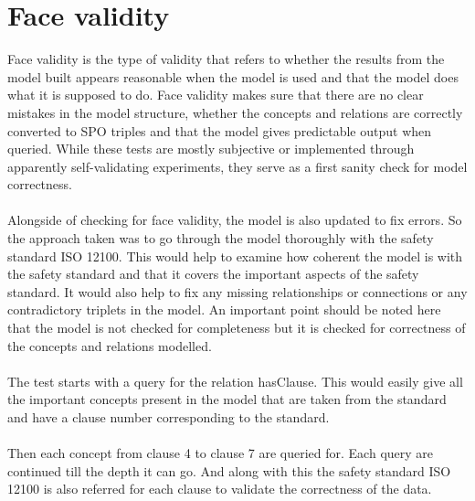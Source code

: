 \section{Face validity} \label{face_validity}
Face validity is the type of validity that refers to whether the results from the model built appears reasonable when the model is used and that the model does what it is supposed to do. Face validity makes sure that there are no clear mistakes in the model structure, whether the concepts and relations are correctly converted to SPO triples and that the model gives predictable output when queried. While these tests are mostly subjective or implemented through apparently self-validating experiments, they serve as a first sanity check for model correctness.

\paragraph{} Alongside of checking for face validity, the model is also updated to fix errors. So the approach taken was to go through the model thoroughly with the safety standard ISO 12100. This would help to examine how coherent the model is with the safety standard and that it covers the important aspects of the safety standard. It would also help to fix any missing relationships or connections or any contradictory triplets in the model. An important point should be noted here that the model is not checked for completeness but it is checked for correctness of the concepts and relations modelled.

\paragraph{} The test starts with a query for the relation hasClause. This would easily give all the important concepts present in the model that are taken from the standard and have a clause number corresponding to the standard. 


\bigskip\bigskip {}

\paragraph{} Then each concept from clause 4 to clause 7 are queried for. Each query are continued till the depth it can go. And along with this the safety standard ISO 12100 is also referred for each clause to validate the correctness of the data. 

